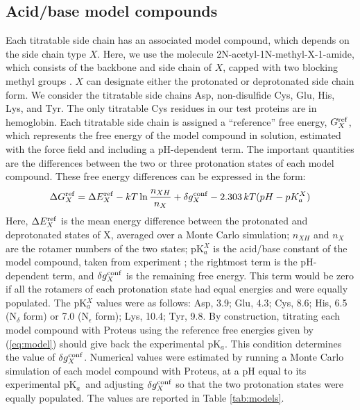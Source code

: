 \documentclass[a4paper,12pt]{article}
\newcommand{\pk}{pK$_a$}
\begin{document}
\subsection{Acid/base model compounds}
Each titratable side chain has an associated model compound, which depends on the side chain type $X$. Here, we use the
molecule 2N-acetyl-1N-methyl-X-1-amide, which consists of the backbone and side chain of $X$, capped with two blocking
methyl groups \cite{Simonson04}. $X$ can designate either the protonated or deprotonated side chain form. We consider
the titratable side chains Asp, non-disulfide Cys, Glu, His, Lys, and Tyr. The only titratable Cys residues in our test
proteins are in hemoglobin. Each titratable side chain is assigned a ``reference'' free energy, $G_X^{\rm ref}$, which represents
the free energy of the model compound in solution, estimated with the force field and including a pH-dependent term.
The important quantities are the differences between the two or three protonation states of each model compound. These
free energy differences can be expressed in the form:
\begin{equation} \label{eq:model}
\Delta G_X^{\rm ref} = \Delta E_X^{\rm ref} - kT \ln \frac{n_{XH}}{n_X} + \delta g_X^{\rm conf} 
     - 2.303 \, kT (pH - pK_a^X) 
\end{equation}
Here, $\Delta E_X^{\rm ref}$ is the mean energy difference between the protonated and deprotonated states of X, averaged
over a Monte Carlo simulation; $n_{XH}$ and $n_X$ are the rotamer numbers of the two states; pK$_a^X$ is the acid/base
constant of the model compound, taken from experiment \cite{Pace09,Aleksandrov10b}; the rightmost term is the pH-dependent
term, and $\delta g_X^{\rm conf}$ is the remaining free energy. This term would be zero if all the rotamers of each protonation
state had equal energies and were equally populated. The pK$_a^X$ values were as follows: Asp, 3.9; Glu, 4.3; Cys,
8.6; His, 6.5 (N$_{\delta}$ form) or 7.0 (N$_{\epsilon}$ form); Lys, 10.4; Tyr, 9.8. By construction, titrating each model
compound with Proteus using the reference free energies given by (\ref{eq:model}) should give back the experimental \pk.
This condition determines the value of $\delta g_X^{\rm conf}$. Numerical values were estimated by running a Monte Carlo
simulation of each model compound with Proteus, at a pH equal to its experimental \pk\, and adjusting $\delta g_X^{\rm conf}$
so that the two protonation states were equally populated. The values are reported in Table \ref{tab:models}. 
\end{document}
